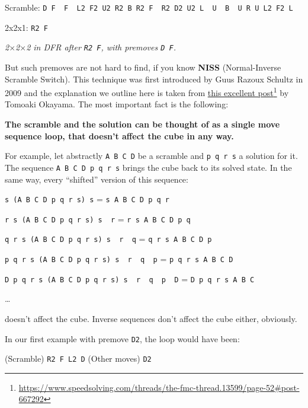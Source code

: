 \documentclass[11pt,a4paper]{book}
\newcommand{\p}{\textquotesingle}
\newcommand{\m}{\texttt}
\newcommand{\ps}{\p\,\,}
\begin{document}
\begin{center}
Scramble: \m{D F\ps F\ps L2 F2 U2 R2 B R2 F\ps R2 D2 U2 L\ps U\ps B\ps U R U L2 F2 L\p}

2x2x1: \m{R2 F}



\emph{2$\times$2$\times$2 in DFR after \m{R2 F}, with premoves \m{D F\p}.}
\end{center}

But such premoves are not hard to find, if you know \textbf{NISS} (Normal-Inverse Scramble Switch). This technique was first introduced by Guus Razoux Schultz in 2009 and the explanation we outline here is taken from \href{https://www.speedsolving.com/threads/the-fmc-thread.13599/page-52##post-667292}{this excellent post}\footnote{\url{https://www.speedsolving.com/threads/the-fmc-thread.13599/page-52\#post-667292}} by Tomoaki Okayama. The most important fact is the following:

\begin{framed}
\textbf{The scramble and the solution can be thought of as a single move sequence loop, that doesn't affect the cube in any way.}
\end{framed}

For example, let abstractly \m{A B C D} be a scramble and \m{p q r s} a solution for it. The sequence \m{A B C D p q r s} brings the cube back to its solved state. In the same way, every ``shifted'' version of this sequence:

\begin{center}
\m{s (A B C D p q r s) s\p} = \m{s A B C D p q r}

\m{r s (A B C D p q r s) s\ps r\p} = \m{r s A B C D p q}

\m{q r s (A B C D p q r s) s\ps r\ps q\p} = \m{q r s A B C D p}

\m{p q r s (A B C D p q r s) s\ps r\ps q\ps p\p} = \m{p q r s A B C D}

\m{D p q r s (A B C D p q r s) s\ps r\ps q\ps p\ps D\p} = \m{D p q r s A B C}

\dots
\end{center}

doesn't affect the cube. Inverse sequences don't affect the cube either, obviously.

In our first example with premove \m{D2}, the loop would have been:

\begin{center}
(Scramble) \m{R2 F L2 D\p} (Other moves) \m{D2}
\end{center}
\end{document}
